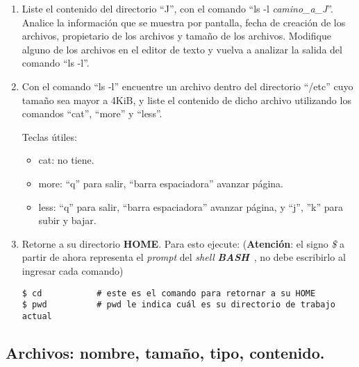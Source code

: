 \documentclass[12pt]{article}
\newcommand{\bash}{\textbf{\emph{BASH}}\ }
\begin{document}
\begin{enumerate}
    \item Liste el contenido del directorio ``J'', con el comando ``ls -l
        \emph{camino\_a\_J}''.  Analice la información que se muestra por
        pantalla, fecha de creación de los archivos, propietario de los
        archivos y tamaño de los archivos. Modifique alguno de los archivos en
        el editor de texto y vuelva a analizar la salida del comando ``ls
        -l''.

    \item Con el comando ``ls -l'' encuentre un archivo dentro del directorio
        ``/etc'' cuyo tamaño sea mayor a 4KiB, y liste el contenido de dicho
        archivo utilizando los comandos ``cat'', ``more'' y ``less''.

    Teclas útiles:

    \begin{itemize}

        \itemsep2pt \parskip0pt 

        \item cat: no tiene.

        \item more: ``q'' para salir, ``barra espaciadora'' avanzar página.

        \item less: ``q'' para salir, ``barra espaciadora'' avanzar página, y
            ``j'', ''k'' para subir y bajar.

    \end{itemize}

    \item Retorne a su directorio \textbf{HOME}. Para esto ejecute:
        (\textbf{Atención}: el signo \emph{\$} a partir de ahora representa el
        \emph{prompt} del \emph{shell} \bash, no debe escribirlo al ingresar
        cada comando)

        \begin{verbatim}
$ cd           # este es el comando para retornar a su HOME
$ pwd          # pwd le indica cuál es su directorio de trabajo actual
        \end{verbatim}

\end{enumerate}

\subsection{Archivos: nombre, tamaño, tipo, contenido.}
\end{document}
